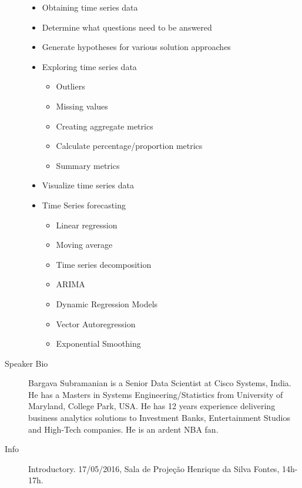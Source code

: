 \begin{description}
\begin{itemize}
   \item Obtaining time series data
   \item Determine what questions need to be answered
   \item Generate hypotheses for various solution approaches
   \item Exploring time series data
   \begin{itemize}
      \item Outliers
      \item Missing values
      \item Creating aggregate metrics
      \item Calculate percentage/proportion metrics
      \item Summary metrics
   \end{itemize}
   \item Visualize time series data
   \item Time Series forecasting
   \begin{itemize}
      \item Linear regression
      \item Moving average
      \item Time series decomposition
      \item ARIMA
      \item Dynamic Regression Models
      \item Vector Autoregression
      \item Exponential Smoothing
   \end{itemize}
\end{itemize}

    \item[Speaker Bio] Bargava Subramanian is a Senior Data Scientist at Cisco Systems, India. He has a Masters in Systems Engineering/Statistics from University of Maryland, College Park, USA. He has 12 years experience delivering business analytics solutions to Investment Banks, Entertainment Studios and High-Tech companies. He is an ardent NBA fan.
    \item[Info] Introductory. 17/05/2016, Sala de Projeção Henrique da Silva Fontes, 14h-17h.
\end{description} 
